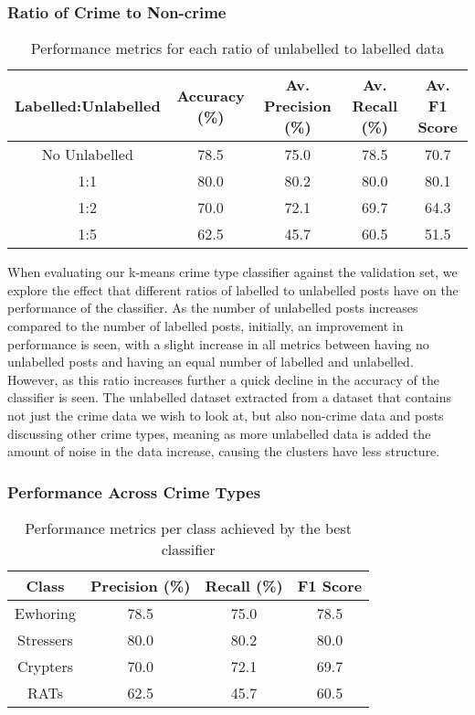 \documentclass[12pt,a4paper,twoside,openright]{report}
\begin{document}
\subsubsection{Ratio of Crime to Non-crime}
\begin{table*}[h]
\centering
\begin{tabular}{|c|c|c|c|c|}
\hline
Labelled:Unlabelled & Accuracy (\%) & Av. Precision (\%) & Av. Recall (\%) & Av. F1 Score\\ \hline \hline
No Unlabelled & 78.5 & 75.0 & 78.5 & 70.7 \\ \hline
1:1 & 80.0 & 80.2 & 80.0 & 80.1 \\ \hline
1:2 & 70.0 & 72.1 & 69.7 & 64.3 \\ \hline
1:5 & 62.5 & 45.7 & 60.5  & 51.5 \\ \hline
\end{tabular}
\caption{Performance metrics for each ratio of unlabelled to labelled data}
\end{table*}
\noindent
When evaluating our k-means crime type classifier against the validation set, we explore the effect that different ratios of labelled to unlabelled posts have on the performance of the classifier. As the number of unlabelled posts increases compared to the number of labelled posts, initially, an improvement in performance is seen, with a slight increase in all metrics between having no unlabelled posts and having an equal number of labelled and unlabelled. However, as this ratio increases further a quick decline in the accuracy of the classifier is seen. The unlabelled dataset extracted from a dataset that contains not just the crime data we wish to look at, but also non-crime data and posts discussing other crime types, meaning as more unlabelled data is added the amount of noise in the data increase, causing the clusters have less structure.

\subsubsection{Performance Across Crime Types}
\begin{table*}[h]
\centering
\begin{tabular}{|c|c|c|c|}
\hline
Class & Precision (\%) & Recall (\%) & F1 Score\\ \hline \hline
Ewhoring & 78.5 & 75.0 & 78.5 \\ \hline
Stressers & 80.0 & 80.2 & 80.0 \\ \hline
Crypters & 70.0 & 72.1 & 69.7 \\ \hline
RATs & 62.5 & 45.7 & 60.5  \\ \hline
\end{tabular}
\caption{Performance metrics per class achieved by the best classifier} \label{table:perclass}
\end{table*}
\end{document}
